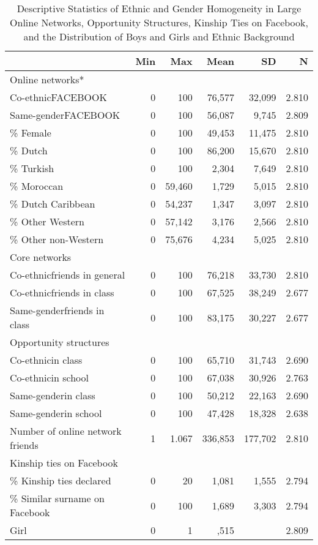 \documentclass[letterpaper]{article} %
\begin{document}
\begin{table}[H]
\centering
\caption{Descriptive Statistics of Ethnic and Gender Homogeneity in Large Online Networks, 	Opportunity Structures, Kinship Ties on Facebook, and the Distribution of Boys and Girls and Ethnic Background}
\begin{tabular}{lrrrrr}
\hline
 & Min & Max & Mean & SD & N\\
\hline
Online networks* & & & & & \\
Co-ethnicFACEBOOK & 0 & 100 & 76,577 & 32,099 &  2.810\\
Same-genderFACEBOOK & 0 & 100 & 56,087 & 9,745 & 2.809\\
\% Female & 0 & 100 & 49,453 & 11,475 & 2.810\\
\% Dutch & 0  & 100 & 86,200 & 15,670 & 2.810\\
\% Turkish & 0 & 100 & 2,304 & 7,649 & 2.810\\
\% Moroccan & 0 & 59,460 & 1,729 & 5,015 & 2.810\\
\% Dutch Caribbean & 0 & 54,237 & 1,347 & 3,097 & 2.810\\
\% Other Western & 0 & 57,142 & 3,176 & 2,566 & 2.810\\
\% Other non-Western & 0 & 75,676 & 4,234 & 5,025 & 2.810\\
Core networks & & & & &\\
Co-ethnicfriends in general & 0 & 100 & 76,218 & 33,730 & 2.810\\
Co-ethnicfriends in class & 0 & 100 & 67,525 & 38,249 & 2.677\\
Same-genderfriends in class & 0 & 100 & 83,175 & 30,227 & 2.677\\
Opportunity structures & & & & &\\
Co-ethnicin class & 0 & 100 & 65,710  & 31,743 & 2.690\\
Co-ethnicin school & 0 & 100 & 67,038 & 30,926 & 2.763\\
Same-genderin class & 0 & 100 & 50,212 & 22,163 & 2.690\\
Same-genderin school & 0 & 100 & 47,428 & 18,328 & 2.638\\
Number of online network friends  & 1 & 1.067 & 336,853 & 177,702 & 2.810\\
Kinship ties on Facebook & & & & &\\
\% Kinship ties declared  & 0 & 20 & 1,081 & 1,555 & 2.794\\
\% Similar surname on Facebook & 0 & 100 & 1,689  & 3,303 & 2.794\\
Girl & 0 & 1 & ,515 & & 2.809\\

\end{tabular}
\end{table}
\end{document}
